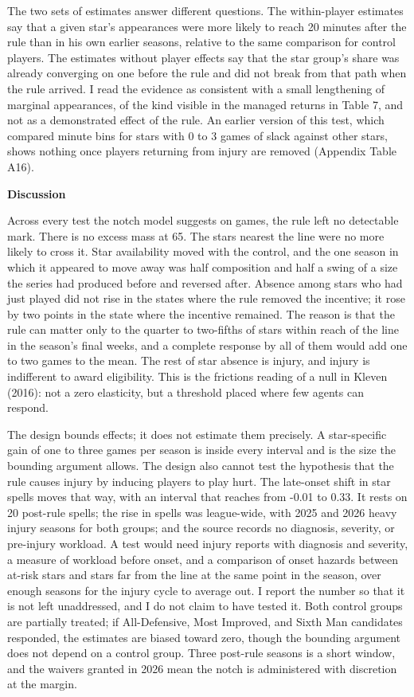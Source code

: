 \documentclass[12pt]{article}
\newcommand{\lone}[1]{\par\medskip\noindent\begin{center}\textbf{#1}\end{center}\par\nopagebreak}
\begin{document}
The two sets of estimates answer different questions. The within-player estimates say that a given star's appearances were more likely to reach 20 minutes after the rule than in his own earlier seasons, relative to the same comparison for control players. The estimates without player effects say that the star group's share was already converging on one before the rule and did not break from that path when the rule arrived. I read the evidence as consistent with a small lengthening of marginal appearances, of the kind visible in the managed returns in Table 7, and not as a demonstrated effect of the rule. An earlier version of this test, which compared minute bins for stars with 0 to 3 games of slack against other stars, shows nothing once players returning from injury are removed (Appendix Table A16).


\lone{Discussion}


Across every test the notch model suggests on games, the rule left no detectable mark. There is no excess mass at 65. The stars nearest the line were no more likely to cross it. Star availability moved with the control, and the one season in which it appeared to move away was half composition and half a swing of a size the series had produced before and reversed after. Absence among stars who had just played did not rise in the states where the rule removed the incentive; it rose by two points in the state where the incentive remained. The reason is that the rule can matter only to the quarter to two-fifths of stars within reach of the line in the season's final weeks, and a complete response by all of them would add one to two games to the mean. The rest of star absence is injury, and injury is indifferent to award eligibility. This is the frictions reading of a null in Kleven (2016): not a zero elasticity, but a threshold placed where few agents can respond.

The design bounds effects; it does not estimate them precisely. A star-specific gain of one to three games per season is inside every interval and is the size the bounding argument allows. The design also cannot test the hypothesis that the rule causes injury by inducing players to play hurt. The late-onset shift in star spells moves that way, with an interval that reaches from -0.01 to 0.33. It rests on 20 post-rule spells; the rise in spells was league-wide, with 2025 and 2026 heavy injury seasons for both groups; and the source records no diagnosis, severity, or pre-injury workload. A test would need injury reports with diagnosis and severity, a measure of workload before onset, and a comparison of onset hazards between at-risk stars and stars far from the line at the same point in the season, over enough seasons for the injury cycle to average out. I report the number so that it is not left unaddressed, and I do not claim to have tested it. Both control groups are partially treated; if All-Defensive, Most Improved, and Sixth Man candidates responded, the estimates are biased toward zero, though the bounding argument does not depend on a control group. Three post-rule seasons is a short window, and the waivers granted in 2026 mean the notch is administered with discretion at the margin.
\end{document}
